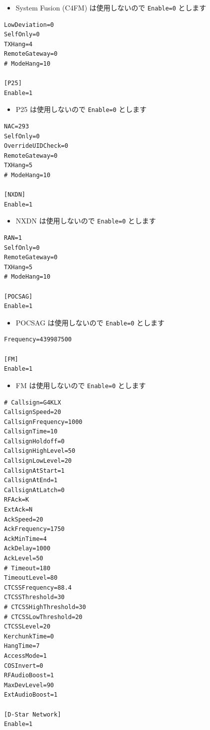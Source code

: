 \documentclass[a4j,oneside]{ujbook}
\begin{document}
\begin{itemize}
 \renewcommand{\labelitemi}{$\triangleright$}
 \item System Fusion (C4FM) は使用しないので \verb+Enable=0+ とします
\end{itemize}
\begin{verbatim}
LowDeviation=0
SelfOnly=0
TXHang=4
RemoteGateway=0
# ModeHang=10

[P25]
Enable=1
\end{verbatim}
\begin{itemize}
 \renewcommand{\labelitemi}{$\triangleright$}
 \item P25 は使用しないので \verb+Enable=0+ とします
\end{itemize}
\begin{verbatim}
NAC=293
SelfOnly=0
OverrideUIDCheck=0
RemoteGateway=0
TXHang=5
# ModeHang=10

[NXDN]
Enable=1
\end{verbatim}
\begin{itemize}
 \renewcommand{\labelitemi}{$\triangleright$}
 \item NXDN は使用しないので \verb+Enable=0+ とします
\end{itemize}
\begin{verbatim}
RAN=1
SelfOnly=0
RemoteGateway=0
TXHang=5
# ModeHang=10

[POCSAG]
Enable=1
\end{verbatim}
\begin{itemize}
 \renewcommand{\labelitemi}{$\triangleright$}
 \item POCSAG は使用しないので \verb+Enable=0+ とします
\end{itemize}
\begin{verbatim}
Frequency=439987500

[FM]
Enable=1
\end{verbatim}
\begin{itemize}
 \renewcommand{\labelitemi}{$\triangleright$}
 \item FM は使用しないので \verb+Enable=0+ とします
\end{itemize}
\begin{verbatim}
# Callsign=G4KLX
CallsignSpeed=20
CallsignFrequency=1000
CallsignTime=10
CallsignHoldoff=0
CallsignHighLevel=50
CallsignLowLevel=20
CallsignAtStart=1
CallsignAtEnd=1
CallsignAtLatch=0
RFAck=K
ExtAck=N
AckSpeed=20
AckFrequency=1750
AckMinTime=4
AckDelay=1000
AckLevel=50
# Timeout=180
TimeoutLevel=80
CTCSSFrequency=88.4
CTCSSThreshold=30
# CTCSSHighThreshold=30
# CTCSSLowThreshold=20
CTCSSLevel=20
KerchunkTime=0
HangTime=7
AccessMode=1
COSInvert=0
RFAudioBoost=1
MaxDevLevel=90
ExtAudioBoost=1

[D-Star Network]
Enable=1
\end{verbatim}
\end{document}
